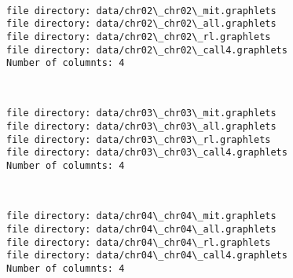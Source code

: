 \documentclass[11pt]{article}
\begin{document}
    \begin{center}
    \end{center}
    { \hspace*{\fill} \\}
    
    \begin{Verbatim}[commandchars=\\\{\}]
file directory: data/chr02\_chr02\_mit.graphlets
file directory: data/chr02\_chr02\_all.graphlets
file directory: data/chr02\_chr02\_rl.graphlets
file directory: data/chr02\_chr02\_call4.graphlets
Number of columnts: 4

    \end{Verbatim}

    \begin{center}
    \end{center}
    { \hspace*{\fill} \\}
    
    \begin{Verbatim}[commandchars=\\\{\}]
file directory: data/chr03\_chr03\_mit.graphlets
file directory: data/chr03\_chr03\_all.graphlets
file directory: data/chr03\_chr03\_rl.graphlets
file directory: data/chr03\_chr03\_call4.graphlets
Number of columnts: 4

    \end{Verbatim}

    \begin{center}
    \end{center}
    { \hspace*{\fill} \\}
    
    \begin{Verbatim}[commandchars=\\\{\}]
file directory: data/chr04\_chr04\_mit.graphlets
file directory: data/chr04\_chr04\_all.graphlets
file directory: data/chr04\_chr04\_rl.graphlets
file directory: data/chr04\_chr04\_call4.graphlets
Number of columnts: 4

    \end{Verbatim}

    \begin{center}
    \end{center}
    { \hspace*{\fill} \\}
    
\end{document}
